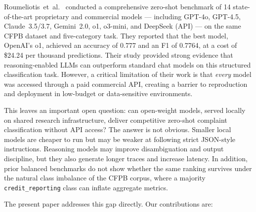 \documentclass[a4paper,fleqn]{cas-dc}
\begin{document}
Roumeliotis~et~al.\ \cite{roumeliotis2025think} conducted a
comprehensive zero-shot benchmark of 14 state-of-the-art proprietary
and commercial models --- including GPT-4o, GPT-4.5, Claude~3.5/3.7,
Gemini~2.0, o1, o3-mini, and DeepSeek (API) --- on the same CFPB
dataset and five-category task. They reported that the best model,
OpenAI's o1, achieved an accuracy of 0.777 and an F1 of 0.7764, at a
cost of \$24.24 per thousand predictions. Their study provided strong
evidence that reasoning-enabled LLMs can outperform standard chat
models on this structured classification task. However, a critical
limitation of their work is that \emph{every} model was accessed
through a paid commercial API, creating a barrier to reproduction
and deployment in low-budget or data-sensitive environments.

This leaves an important open question: can open-weight models, served
locally on shared research infrastructure, deliver competitive
zero-shot complaint classification without API access? The answer is
not obvious. Smaller local models are cheaper to run but may be weaker
at following strict JSON-style instructions. Reasoning models may
improve disambiguation and output discipline, but they also generate
longer traces and increase latency. In addition, prior balanced
benchmarks do not show whether the same ranking survives under the
natural class imbalance of the CFPB corpus, where a majority
\texttt{credit\_reporting} class can inflate aggregate metrics.

The present paper addresses this gap directly. Our contributions are:
\end{document}
